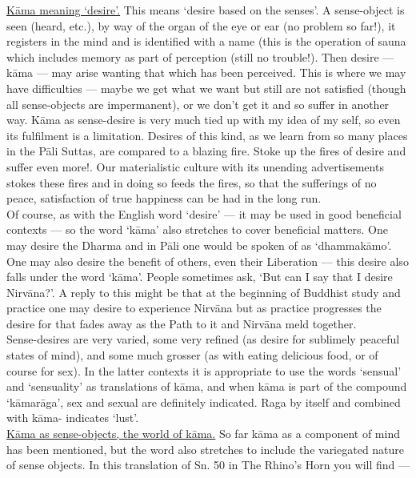 \underline{K\=ama meaning `desire'.} This means `desire based on the senses'. A sense-object is seen (heard, etc.), by way of the organ of the eye or ear (no problem so far!), it registers in the mind and is identified with a name (this is the operation of sauna which includes memory as part of perception (still no trouble!). Then desire — k\=ama — may arise wanting that which has been perceived. This is where we may have difficulties — maybe we get what we want but still are not satisfied (though all sense-objects are impermanent), or we don't get it and so suffer in another way. K\=ama as sense-desire is very much tied up with my idea of my self, so even its fulfilment is a limitation. Desires of this kind, as we learn from so many places in the P\=ali Suttas, are compared to a blazing fire. Stoke up the fires of desire and suffer even more!. Our materialistic culture with its unending advertisements stokes these fires and in doing so feeds the fires, so that the sufferings of no peace, satisfaction of true happiness can be had in the long run.\\

Of course, as with the English word `desire' — it may be used in good beneficial contexts — so the word `k\=ama' also stretches to cover beneficial matters. One may desire the Dharma and in P\=ali one would be spoken of as `dhammak\=amo'. One may also desire the benefit of others, even their Liberation — this desire also falls under the word `k\=ama'. People sometimes ask, `But can I say that I desire Nirv\=ana?'. A reply to this might be that at the beginning of Buddhist study and practice one may desire to experience Nirv\=ana but as practice progresses the desire for that fades away as the Path to it and Nirv\=ana meld together.\\

Sense-desires are very varied, some very refined (as desire for sublimely peaceful states of mind), and some much grosser (as with eating delicious food, or of course for sex). In the latter contexts it is appropriate to use the words `sensual' and `sensuality' as translations of k\=ama, and when k\=ama is part of the compound `k\=amar\=aga', sex and sexual are definitely indicated. Raga by itself and combined with k\=ama- indicates `lust'.\\

\underline{K\=ama as sense-objects, the world of k\=ama.} So far k\=ama as a component of mind has been mentioned, but the word also stretches to include the variegated nature of sense objects. In this translation of Sn. 50 in The Rhino's Horn you will find —


